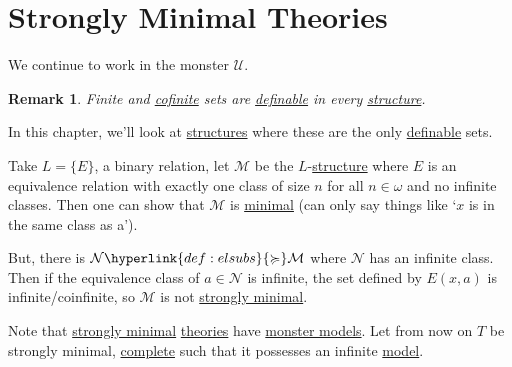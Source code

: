 \documentclass{article}
\DeclareMathOperator{\acl}{acl}
\newtheorem{nremark}[nthm]{Remark}
\newcommand{\named}[1]{\textbf{#1}\index{#1}}
\newcommand{\M}{\mathcal{M}}
\begin{document}
\clearpage
\section{Strongly Minimal Theories}
We continue to work in the monster $\mathcal{U}$.
\begin{nremark}
  Finite and \hyperlink{def:cofinite}{cofinite} sets are \hyperlink{def:def}{definable} in every \hyperlink{def:str}{structure}.
\end{nremark}
In this chapter, we'll look at \hyperlink{def:str}{structures} where these are the only \hyperlink{def:def}{definable} sets.
\begin{eg}
  Take $L = \{E\}$, a binary relation, let $\mathcal{M}$ be the $L$-\hyperlink{def:str}{structure} where $E$ is an equivalence relation with exactly one class of size $n$ for all $n \in \omega$ and no infinite classes.
  Then one can show that $\mathcal{M}$ is \hyperlink{def:minimal}{minimal} (can only say things like `$x$ is in the same class as a').

  But, there is $\mathcal{N} \hyperlink{def:elsubs}{\succcurlyeq} \mathcal{M}$ where $\mathcal{N}$ has an infinite class.
  Then if the equivalence class of $a \in \mathcal{N}$ is infinite, the set defined by $E(x,a)$ is infinite/coinfinite, so $\M$ is not \hyperlink{def:minimal}{strongly minimal}.
\end{eg}
Note that \hyperlink{def:minimal}{strongly minimal} \hyperlink{def:ltheory}{theories} have \hyperlink{def:monster}{monster models}.
Let from now on $T$ be strongly minimal, \hyperlink{def:complete}{complete} such that it possesses an infinite \hyperlink{def:model}{model}.
\end{document}
